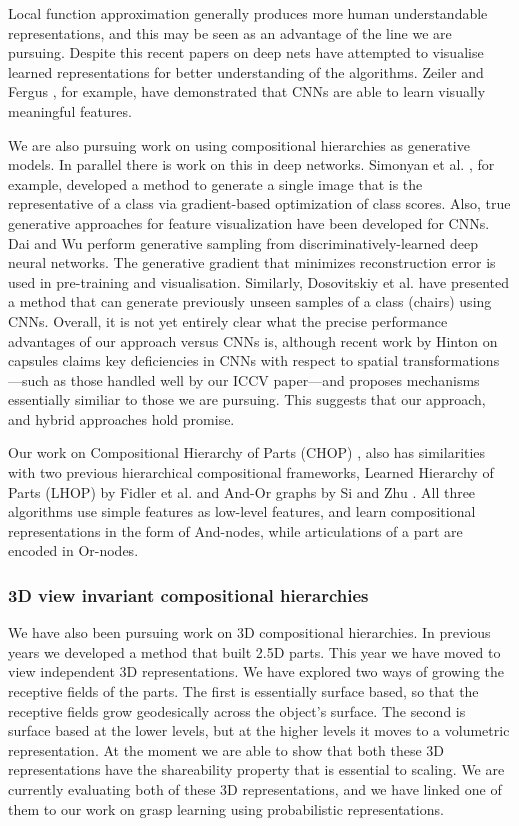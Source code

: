\documentclass[a4paper,11pt,pdf]{../templates/pacmanreport}
\begin{document}
Local function approximation generally produces more human understandable representations, and this may be seen as an advantage of the line we are pursuing. Despite this recent papers on deep nets \cite{deepvis,Simonyan14a,DBLP:journals/corr/MahendranV15,deepvis2} have attempted to visualise learned representations for better understanding of the algorithms. Zeiler and Fergus \cite{deepvis}, for example, have demonstrated that CNNs are able to learn visually meaningful features. 

We are also pursuing work on using compositional hierarchies as generative models. In parallel there is work on this in deep networks. Simonyan et al. \cite{Simonyan14a}, for example, developed a method to generate a single image that is the representative of a class via gradient-based optimization of class scores. Also, true generative approaches for feature visualization have been developed for CNNs. Dai and Wu \cite{DBLP:journals/corr/DaiW14} perform generative sampling from discriminatively-learned deep neural networks. The generative gradient that minimizes reconstruction error is used in pre-training and visualisation. Similarly, Dosovitskiy et al. \cite{DB15} have presented a method that can generate previously unseen samples of a class (chairs) using CNNs. Overall, it is not yet entirely clear what the precise performance advantages of our approach versus CNNs is, although recent work by Hinton on capsules claims key deficiencies in CNNs with respect to spatial transformations---such as those handled well by our ICCV paper---and proposes mechanisms essentially similiar to those we are pursuing. This suggests that our approach, and hybrid approaches hold promise.

Our work on Compositional Hierarchy of Parts (CHOP) \cite{chop,CHOPManifold}, also has similarities with two previous hierarchical compositional frameworks, Learned Hierarchy of Parts (LHOP) by Fidler et al. \cite{fidler_cvpr07,lhop_book} and And-Or graphs by Si and Zhu \cite{report:SCZhu}. All three algorithms use simple features as low-level features, and learn compositional representations in the form of And-nodes, while articulations of a part are encoded in Or-nodes. 

\subsubsection{3D view invariant compositional hierarchies}

We have also been pursuing work on 3D compositional hierarchies. In previous years we developed a method that built 2.5D parts. This year we have moved to view independent 3D representations. We have explored two ways of growing the receptive fields of the parts. The first is essentially surface based, so that the receptive fields grow geodesically across the object's surface. The second is surface based at the lower levels, but at the higher levels it moves to a volumetric representation. At the moment we are able to show that both these 3D representations have the shareability property that is essential to scaling. We are currently evaluating both of these 3D representations, and we have linked one of them to our work on grasp learning using probabilistic representations.
\end{document}
